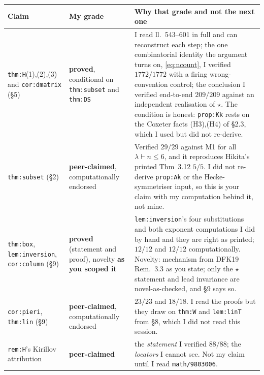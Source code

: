 \documentclass[11pt]{article}
\begin{document}
\begin{center}\small
\begin{tabular}{@{}p{}p{}p{}@{}}
\toprule
\textbf{Claim} & \textbf{My grade} & \textbf{Why that grade and not the next one}\\
\midrule
\texttt{thm:H}(1),(2),(3) and \texttt{cor:dmatrix} (\S5)
 & \textbf{proved}, conditional on \texttt{thm:subset} and \texttt{thm:DS}
 & I read ll.~543--601 in full and can reconstruct each step; the one combinatorial identity the
   argument turns on, \eqref{eq:ncount}, I verified $1772/1772$ with a firing wrong-convention control;
   the conclusion I verified end-to-end $209/209$ against an independent realisation of $\star$. The
   condition is honest: \texttt{prop:Kk} rests on the Coxeter facts (H3),(H4) of \S2.3, which I used
   but did not re-derive.\\
\texttt{thm:subset} (\S2) & \textbf{peer-claimed}, computationally endorsed
 & Verified $29/29$ against M1 for all $\lambda\vdash n\le6$, and it reproduces Hikita's printed
   Thm~3.12 $5/5$. I did not re-derive \texttt{prop:Ak} or the Hecke-symmetriser input, so this is your
   claim with my computation behind it, not mine.\\
\texttt{thm:box}, \texttt{lem:inversion}, \texttt{cor:column} (\S9)
 & \textbf{proved} (statement and proof), novelty \textbf{as you scoped it}
 & \texttt{lem:inversion}'s four substitutions and both exponent computations I did by hand and they
   are right as printed; $12/12$ and $12/12$ computationally. Novelty: mechanism from DFK19 Rem.~3.3
   as you state; only the $\star$ statement and lead invariance are novel-as-checked, and \S9 says so.\\
\texttt{cor:pieri}, \texttt{thm:lin} (\S9) & \textbf{peer-claimed}, computationally endorsed
 & $23/23$ and $18/18$. I read the proofs but they draw on \texttt{thm:W} and \texttt{lem:linT} from
   \S8, which I did not read this session.\\
\texttt{rem:H}'s Kirillov attribution & \textbf{peer-claimed}
 & the \emph{statement} I verified $88/88$; the \emph{locators} I cannot see. Not my claim until I read
   \texttt{math/9803006}.\\
\bottomrule
\end{tabular}
\end{center}
\end{document}
